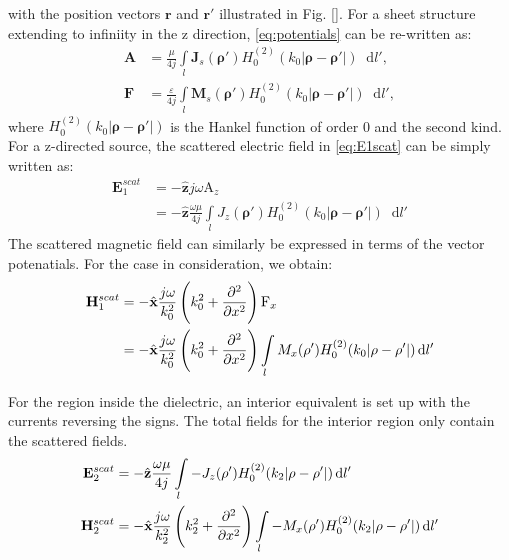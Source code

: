 \documentclass[11pt]{article}
\renewcommand{\v}[1]{\mathbf{#1}} %
\renewcommand{\O}{\omega}  %
\newcommand{\E}{\varepsilon}  %
\renewcommand{\u}{\mu}  %
\newcommand{\p}{\rho}  %
\renewcommand{\^}{\hat}  %
\newcommand*\diff{\mathop{}\!\mathrm{d}} %
\begin{document}
%
with the position vectors $\v r$ and $\v r'$ illustrated in Fig. \ref{}. For a sheet structure extending to infiniity in the z direction, \eqref{eq:potentials} can be re-written as:
%
\begin{subequations}
  \begin{align}
    \v A &=  \frac{\u}{4 j} \int\limits_{l} \v J_s(\v \p') H_0^{(2)}(k_0 |\v \p - \v \p'|) \diff{l'},
    \label{eq:A}\\
    \v F &=  \frac{\E}{4 j} \int\limits_{l} \v M_s(\v \p') H_0^{(2)}(k_0 |\v \p - \v \p'|) \diff{l'},
    \label{eq:Fig}
  \end{align}
  \label{eq:potentials_2d}
\end{subequations}
%
where $H_0^{(2)}(k_0 |\v \p - \v \p'|)$ is the Hankel function of order 0 and the second kind. For a z-directed source, the scattered electric field in \eqref{eq:E1scat} can be simply written as:
%
\begin{equation}
  \begin{split}
    \v E_1^{scat} &= -\hat{\v z} j \O \mathrm A_z \\
    &= -\hat{\v z} \frac{\O \u}{4 j} \int\limits_{l} J_z(\v \p')  H_0^{(2)}(k_0 |\v \p - \v \p'|) \diff{l'}
  \end{split}
  \label{eq:E1sc}
\end{equation}
%
The scattered magnetic field can similarly be expressed in terms of the vector potenatials. For the case in consideration, we obtain:
%
\begin{equation}
  \begin{split}
    \v H_1^{scat} &= -\hat{\v x}  \frac{j \O}{k_0^2}\left(k_0^2 +  \pdv[2]{}{x} \right) \mathrm F_x \\
    &= -\hat{\v x}  \frac{j \O}{k_0^2}\left(k_0^2 +  \pdv[2]{}{x} \right) \int\limits_{l} M_x(\v \p') H_0^{(2)}(k_0 |\v \p - \v \p'|) \diff{l'}
  \end{split}
  \label{eq:H1sc}
\end{equation}

For the region inside the dielectric, an interior equivalent is set up with the currents reversing the signs. The total fields for the interior region only contain the scattered fields.
%
\begin{subequations}
  \begin{align}
    \v E_2^{scat} &= -\hat{\v z} \frac{\O \u}{4 j} \int\limits_{l} -J_z(\v \p')  H_0^{(2)}(k_2 |\v \p - \v \p'|) \diff{l'}
    \label{eq:E2sc}\\
    \v H_2^{scat} &= -\hat{\v x}  \frac{j \O}{k_2^2}\left(k_2^2 +  \pdv[2]{}{x} \right) \int\limits_{l} -M_x(\v \p') H_0^{(2)}(k_2 |\v \p - \v \p'|) \diff{l'}
    \label{eq:H2sc}
  \end{align}
  \label{eq:2sc}
\end{subequations}
\end{document}
